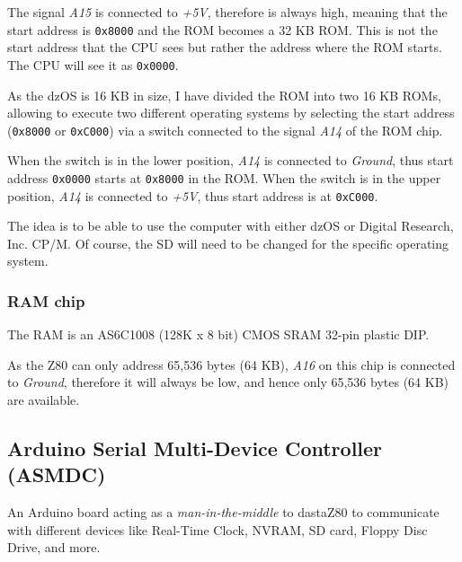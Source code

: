 \documentclass[a4paper,11pt]{article}
\begin{document}
    The signal \textit{A15} is connected to \textit{+5V}, therefore is always
    high, meaning that the start address is \texttt{0x8000} and the ROM becomes
    a 32 KB ROM. This is not the start address that the CPU sees but rather the
    address where the ROM starts. The CPU will see it as \texttt{0x0000}.

    As the dzOS is 16 KB in size, I have divided the ROM into two 16 KB ROMs, 
    allowing to execute two different operating systems by selecting the start
    address (\texttt{0x8000} or \texttt{0xC000}) via a switch connected to the
    signal \textit{A14} of the ROM chip.

    When the switch is in the lower position, \textit{A14} is connected to 
    \textit{Ground}, thus start address \texttt{0x0000} starts at 
    \texttt{0x8000} in the ROM. When the switch is in the upper position, 
    \textit{A14} is connected to \textit{+5V}, thus start address is at 
    \texttt{0xC000}.

    The idea is to be able to use the computer with either dzOS or Digital 
    Research, Inc. CP/M. Of course, the SD will need to be changed for the
    specific operating system.

    \subsubsection{RAM chip}

    The RAM is an AS6C1008 (128K x 8 bit) CMOS SRAM 32-pin plastic DIP.

    As the Z80 can only address 65,536 bytes (64 KB), \textit{A16} on this chip
    is connected to \textit{Ground}, therefore it will always be low, and hence
    only 65,536 bytes (64 KB) are available.

    \subsection{ Arduino Serial Multi-Device Controller (ASMDC)}

    An Arduino board acting as a \textit{man-in-the-middle} to dastaZ80 to
    communicate with different devices like Real-Time Clock, NVRAM, SD card,
    Floppy Disc Drive, and more.
\end{document}
